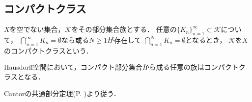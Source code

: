 	\subsection{コンパクトクラス}
		
		\begin{screen}
			\begin{dfn}[コンパクトクラス]
				$X$を空でない集合，$\mathcal{K}$をその部分集合族とする．
				任意の$\{K_n\}_{n=1}^\infty \subset \mathcal{K}$について，
				$\bigcap_{n=1}^\infty K_n = \emptyset$なら或る$N \geq 1$が存在して
				$\bigcap_{n=1}^N K_n = \emptyset$となるとき，
				$\mathcal{K}$を$X$のコンパクトクラスという．
			\end{dfn}
		\end{screen}
		
		\begin{screen}
			\begin{thm}\label{thm:compact_class_Haudorff}
				Hausdorff空間において，コンパクト部分集合から成る任意の族はコンパクトクラスとなる．
			\end{thm}
		\end{screen}
		
		\begin{prf}
			Cantorの共通部分定理(P. \pageref{thm:Cantor_intersection_theorem})より従う．
			\QED
		\end{prf}
		
